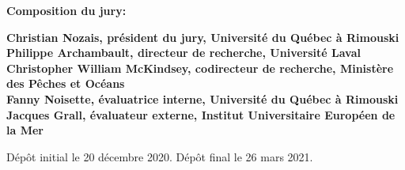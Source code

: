 \thispagestyle{empty}

\null
\vfill
\noindent \textbf{Composition du jury:}\\
\vspace{1cm}

\begin{singlespace}
  \noindent \textbf{Christian Nozais, président du jury, Université du Québec à Rimouski}\\

  \noindent \textbf{Philippe Archambault, directeur de recherche, Université Laval}\\

  \noindent \textbf{Christopher William McKindsey, codirecteur de recherche, Ministère des Pêches et Océans}\\

  \noindent \textbf{Fanny Noisette, évaluatrice interne, Université du Québec à Rimouski}\\

  \noindent \textbf{Jacques Grall, évaluateur externe, Institut Universitaire Européen de la Mer}\\
\end{singlespace}

\vspace{2cm}
\noindent Dépôt initial le 20 décembre 2020.
\hspace{3cm}
\noindent Dépôt final le 26 mars 2021.


\cleardoublepage
